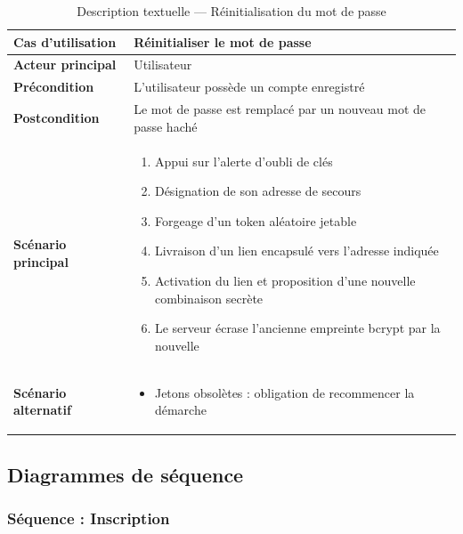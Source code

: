 \begin{table}[H]
    \centering
    \caption{Description textuelle --- Réinitialisation du mot de passe}
    \label{tab:desc_reset_password}
    \renewcommand{\arraystretch}{1.3}
    \begin{tabular}{|p{4cm}|p{8.5cm}|}
        \hline
        \textbf{Cas d'utilisation} & Réinitialiser le mot de passe \\
        \hline
        \textbf{Acteur principal} & Utilisateur \\
        \hline
        \textbf{Précondition} & L'utilisateur possède un compte enregistré \\
        \hline
        \textbf{Postcondition} & Le mot de passe est remplacé par un nouveau mot de passe haché \\
        \hline
        \textbf{Scénario principal} &
        \begin{enumerate}
            \item Appui sur l'alerte d'oubli de clés
            \item Désignation de son adresse de secours
            \item Forgeage d'un token aléatoire jetable
            \item Livraison d'un lien encapsulé vers l'adresse indiquée
            \item Activation du lien et proposition d'une nouvelle combinaison secrète
            \item Le serveur écrase l'ancienne empreinte bcrypt par la nouvelle
        \end{enumerate} \\
        \hline
        \textbf{Scénario alternatif} &
        \begin{itemize}
            \item[4a.] Jetons obsolètes : obligation de recommencer la démarche
        \end{itemize} \\
        \hline
    \end{tabular}
\end{table}

\subsection{Diagrammes de séquence}

\subsubsection{Séquence : Inscription}

